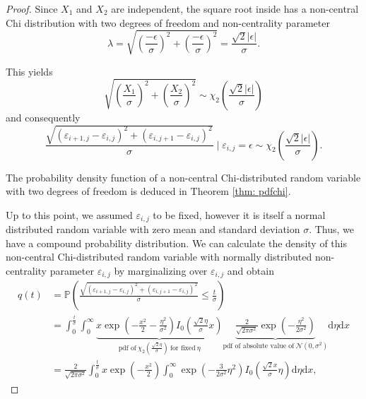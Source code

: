 \documentclass[a4paper,12pt]{article}
\newcommand{\abs}[1]{\lvert#1\rvert}
\theoremstyle{plain}
\theoremstyle{definition}
\numberwithin{equation}{section}
\begin{document}
\begin{proof}
	Since $X_1$ and $X_2$ are independent, the square root inside has a non-central Chi distribution with two degrees of freedom and non-centrality parameter
	\begin{equation*}
		\lambda = \sqrt{\left( \frac{- \epsilon}{\sigma} \right)^2 + \left( \frac{- \epsilon}{\sigma} \right)^2} = \frac{\sqrt{2} \abs{\epsilon}}{\sigma}.
	\end{equation*}
	
	This yields
	\begin{equation*}
		\sqrt{\left( \frac{X_1}{\sigma} \right)^2 + \left( \frac{X_2}{\sigma} \right)^2} \sim \chi_2 \left( \frac{\sqrt{2} \abs{\epsilon}}{\sigma} \right)
	\end{equation*}
	and consequently
	\begin{equation*}
		\frac{\sqrt{(\varepsilon_{i + 1, j} - \varepsilon_{i, j})^2 + (\varepsilon_{i, j + 1} - \varepsilon_{i, j})^2}}{\sigma} \mid \varepsilon_{i, j} = \epsilon \sim \chi_2 \left( \frac{\sqrt{2} \abs{\epsilon}}{\sigma} \right).
	\end{equation*}
	
	The probability density function of a non-central Chi-distributed random variable with two degrees of freedom is deduced in Theorem \ref{thm: pdfchi}.
	
	Up to this point, we assumed $\varepsilon_{i, j}$ to be fixed, however it is itself a normal distributed random variable with zero mean and standard deviation $\sigma$. Thus, we have a compound probability distribution. We can calculate the density of this non-central Chi-distributed random variable with normally distributed non-centrality parameter $\varepsilon_{i, j}$ by marginalizing over $\varepsilon_{i, j}$ and obtain
	\begin{align*}
		q(t) &= \mathbb{P}\left( \frac{\sqrt{(\varepsilon_{i + 1, j} - \varepsilon_{i, j})^2 + (\varepsilon_{i, j + 1} - \varepsilon_{i, j})^2}}{\sigma} \leq \frac{t}{\sigma} \right) \\
		&= \int_0^\frac{t}{\sigma} \int_0^\infty \underbrace{x \exp \left( - \frac{x^2}{2} - \frac{\eta^2}{\sigma^2} \right) I_0 \left( \frac{\sqrt{2} \eta}{\sigma} x \right)}_{\textrm{pdf of} \ \chi_2 \left( \frac{\sqrt{2} \eta}{\sigma} \right) \ \textrm{for fixed} \ \eta} \underbrace{\frac{2}{\sqrt{2 \pi \sigma^2}} \exp \left( - \frac{\eta^2}{2 \sigma^2} \right)}_{\textrm{pdf of absolute value of} \ \mathcal{N}(0, \sigma^2)} \mathrm{d}\eta \mathrm{d}x \\
		&= \frac{2}{\sqrt{2 \pi \sigma^2}} \int_0^\frac{t}{\sigma} x \exp \left( - \frac{x^2}{2} \right) \int_0^\infty \exp \left( - \frac{3}{2 \sigma^2} \eta^2 \right) I_0 \left( \frac{\sqrt{2} x}{\sigma} \eta \right) \mathrm{d}\eta \mathrm{d}x,
	\end{align*}
	

\end{proof}
\end{document}

